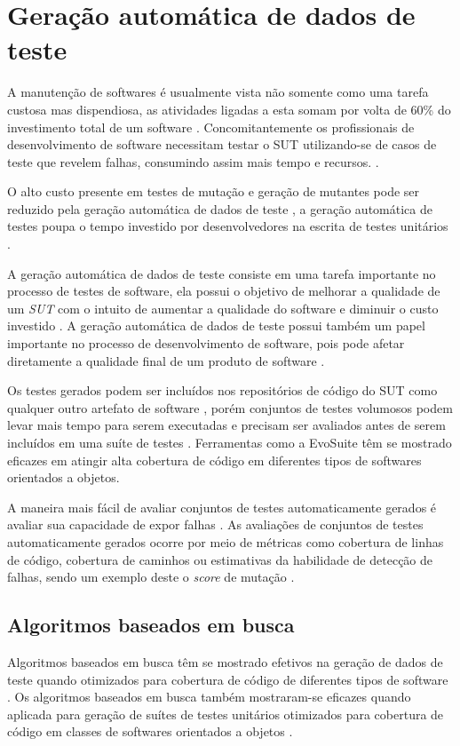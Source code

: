 \documentclass[
	12pt,				%
	oneside,			%
	a4paper,			%
	english,			%
	brazil				%
	]{abntex2ppgsi}
\begin{document}
\chapter{Geração automática de dados de teste}
\label{chap:geracao-automatica-dados-teste}
A manutenção de softwares é usualmente vista não somente como uma tarefa custosa mas dispendiosa, as atividades ligadas a esta somam por volta de 60\% do investimento total de um software \cite{shamshiri2018}. Concomitantemente os profissionais de desenvolvimento de software necessitam testar o SUT utilizando-se de casos de teste que revelem falhas, consumindo assim mais tempo e recursos. \cite{dave2015}.

O alto custo presente em testes de mutação e geração de mutantes pode ser reduzido pela geração automática de dados de teste \cite{dave2015}, a geração automática de testes poupa o tempo investido por desenvolvedores na escrita de testes unitários \cite{shamshiri2018}.

A geração automática de dados de teste consiste em uma tarefa importante no processo de testes de software, ela possui o objetivo de melhorar a qualidade de um \textit{SUT} com o intuito de aumentar a qualidade do software e diminuir o custo investido \cite{shamriski20151115}. A geração automática de dados de teste possui também um papel importante no processo de desenvolvimento de software, pois pode afetar diretamente a qualidade final de um produto de software \cite{dave2015}.

Os testes gerados podem ser incluídos nos repositórios de código do SUT como qualquer outro artefato de software \cite{shamshiri2018}, porém conjuntos de testes volumosos podem levar mais tempo para serem executadas e precisam ser avaliados antes de serem incluídos em uma suíte de testes \cite{shamriski20151115}. Ferramentas como a EvoSuite têm se mostrado eficazes em atingir alta cobertura de código em diferentes tipos de softwares orientados a objetos. \cite{Campos2017}

A maneira mais fácil de avaliar conjuntos de testes automaticamente gerados é avaliar sua capacidade de expor falhas \cite{shamshiri2018}. As avaliações de conjuntos de testes automaticamente gerados ocorre por meio de métricas como cobertura de linhas de código, cobertura de caminhos ou estimativas da habilidade de detecção de falhas, sendo um exemplo deste o \textit{score} de mutação  \cite{shamshiri2018}.





\section{Algoritmos baseados em busca}
Algoritmos baseados em busca têm se mostrado efetivos na geração de dados de teste quando otimizados para cobertura de código de diferentes tipos de software \cite{Campos2017}. Os algoritmos baseados em busca também mostraram-se eficazes quando aplicada para geração de suítes de testes unitários otimizados para cobertura de código em classes de softwares orientados a objetos \cite{Campos2017}.
\end{document}
